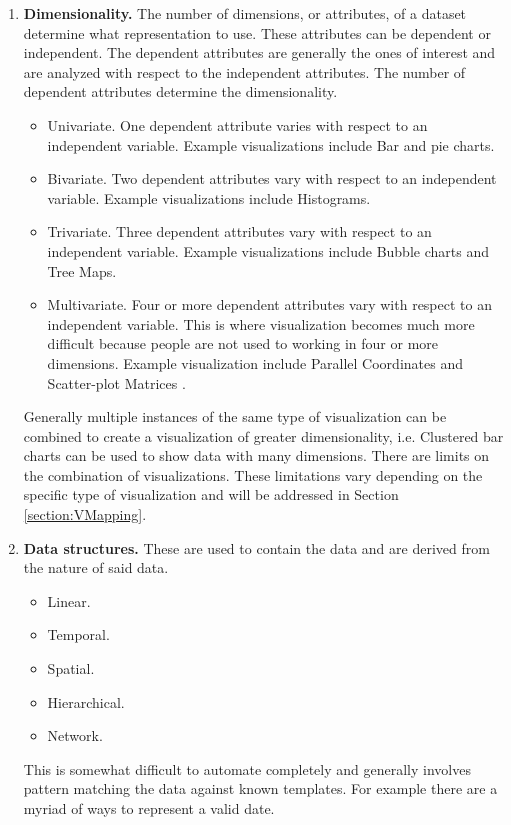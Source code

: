 \documentclass[a4paper, 11pt, titlepage, onehalfspacing]{report}
\begin{document}
\begin{enumerate}
  \item \textbf{Dimensionality.} The number of dimensions, or attributes, of a dataset determine what representation to use. These attributes can be dependent or independent. The dependent attributes are generally the ones of interest and are analyzed with respect to the independent attributes. The number of dependent attributes determine the dimensionality.
  \begin{itemize}
    \item Univariate. One dependent attribute varies with respect to an independent variable. Example visualizations include Bar and pie charts.
    \item Bivariate. Two dependent attributes vary with respect to an independent variable. Example visualizations include Histograms. 
    \item Trivariate. Three dependent attributes vary with respect to an independent variable. Example visualizations include Bubble charts and Tree Maps.
    \item Multivariate. Four or more dependent attributes vary with respect to an independent variable. This is where visualization becomes much more difficult because people are not used to working in four or more dimensions. Example visualization include Parallel Coordinates \cite{inselberg1991parallel} and Scatter-plot Matrices \cite{elmqvist2008rolling}.
  \end{itemize}

  Generally multiple instances of the same type of visualization can be combined to create a visualization of greater dimensionality, i.e. Clustered bar charts can be used to show data with many dimensions. There are limits on the combination of visualizations. These limitations vary depending on the specific type of visualization and will be addressed in Section \ref{section:VMapping}.

  \item \textbf{Data structures.} These are used to contain the data and are derived from the nature of said data.
  \begin{itemize}
    \item Linear.
    \item Temporal.
    \item Spatial.
    \item Hierarchical.
    \item Network.
  \end{itemize}

This is somewhat difficult to automate completely and generally involves pattern matching the data against known templates. For example there are a myriad of ways to represent a valid date.


\end{enumerate}
\end{document}
